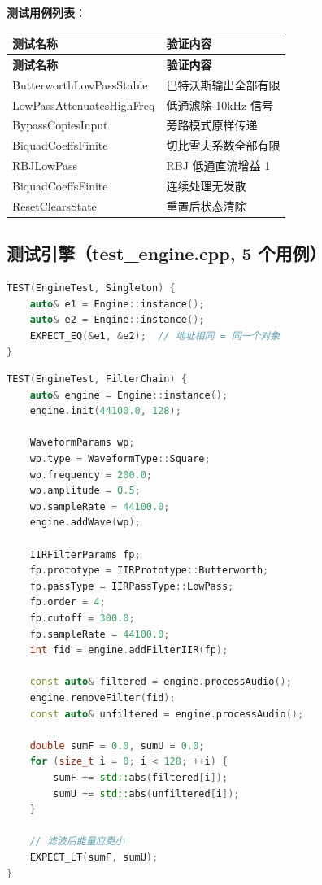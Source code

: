﻿\documentclass[12pt,a4paper,oneside]{ctexbook}
\begin{document}
\textbf{测试用例列表}：

\begin{longtable}{p{4cm}p{9cm}}
    \toprule
    \textbf{测试名称} & \textbf{验证内容} \\
    \midrule
    \endfirsthead
    \toprule
    \textbf{测试名称} & \textbf{验证内容} \\
    \midrule
    \endhead
    \bottomrule
    \endfoot
    ButterworthLowPassStable & 巴特沃斯输出全部有限 \\
    LowPassAttenuatesHighFreq & 低通滤除 10kHz 信号 \\
    BypassCopiesInput & 旁路模式原样传递 \\
    BiquadCoeffsFinite & 切比雪夫系数全部有限 \\
    RBJLowPass & RBJ 低通直流增益 1 \\
    BiquadCoeffsFinite & 连续处理无发散 \\
    ResetClearsState & 重置后状态清除 \\
    \bottomrule
\end{longtable}

\subsection{测试引擎（test\_engine.cpp, 5 个用例）}

\begin{lstlisting}[language=C++, caption={引擎单例测试}]
TEST(EngineTest, Singleton) {
    auto& e1 = Engine::instance();
    auto& e2 = Engine::instance();
    EXPECT_EQ(&e1, &e2);  // 地址相同 = 同一个对象
}
\end{lstlisting}

\begin{lstlisting}[language=C++, caption={引擎滤波器链测试}]
TEST(EngineTest, FilterChain) {
    auto& engine = Engine::instance();
    engine.init(44100.0, 128);

    WaveformParams wp;
    wp.type = WaveformType::Square;
    wp.frequency = 200.0;
    wp.amplitude = 0.5;
    wp.sampleRate = 44100.0;
    engine.addWave(wp);

    IIRFilterParams fp;
    fp.prototype = IIRPrototype::Butterworth;
    fp.passType = IIRPassType::LowPass;
    fp.order = 4;
    fp.cutoff = 300.0;
    fp.sampleRate = 44100.0;
    int fid = engine.addFilterIIR(fp);

    const auto& filtered = engine.processAudio();
    engine.removeFilter(fid);
    const auto& unfiltered = engine.processAudio();

    double sumF = 0.0, sumU = 0.0;
    for (size_t i = 0; i < 128; ++i) {
        sumF += std::abs(filtered[i]);
        sumU += std::abs(unfiltered[i]);
    }

    // 滤波后能量应更小
    EXPECT_LT(sumF, sumU);
}
\end{lstlisting}
\end{document}
